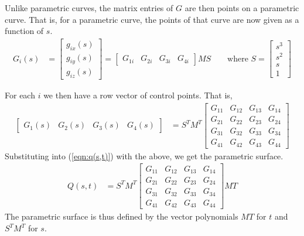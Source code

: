 \documentclass[11pt]{article}
\begin{document}
Unlike parametric curves, the matrix entries of $G$ are then points on a
parametric curve. That is, for a parametric curve, the points of that curve
are now given as a function of $s$.
\begin{align}
    G_i(s) &=
    \begin{bmatrix}
        g_{ix}(s) \\
        g_{iy}(s) \\
        g_{iz}(s)
    \end{bmatrix}
    =
    \begin{bmatrix}
        G_{1i} & G_{2i} & G_{3i} & G_{4i}
    \end{bmatrix}
    MS
    \qquad\text{where }
    S =
    \begin{bmatrix}
        s^3 \\
        s^2 \\
        s   \\
        1
    \end{bmatrix}
\end{align}

For each $i$ we then have a row vector of control points. That is,
\begin{align}
    \begin{bmatrix}
        G_1(s) & G_2(s) & G_3(s) & G_4(s)
    \end{bmatrix}
    &= S^T M^T
    \begin{bmatrix}
        G_{11} & G_{12} & G_{13} & G_{14} \\
        G_{21} & G_{22} & G_{23} & G_{24} \\
        G_{31} & G_{32} & G_{33} & G_{34} \\
        G_{41} & G_{42} & G_{43} & G_{44}
    \end{bmatrix}
\end{align}
Substituting into (\ref{eqn:q(s,t)}) with the above, we get the parametric
surface.
\begin{align}
    Q(s,t)
    &= S^T M^T
    \begin{bmatrix}
        G_{11} & G_{12} & G_{13} & G_{14} \\
        G_{21} & G_{22} & G_{23} & G_{24} \\
        G_{31} & G_{32} & G_{33} & G_{34} \\
        G_{41} & G_{42} & G_{43} & G_{44}
    \end{bmatrix}
    MT
\end{align}
The parametric surface is thus defined by the vector polynomials $MT$ for $t$
and $S^T M^T$ for $s$.
\end{document}
